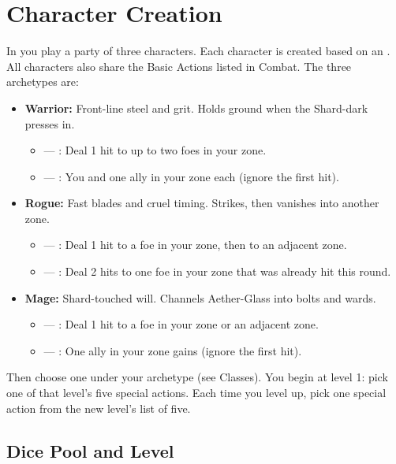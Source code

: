 \section{Character Creation}

In \game{} you play a party of three characters. Each character is created based on an .
All characters also share the Basic Actions listed in Combat. The three archetypes are:

\begin{itemize}
    \item \textbf{Warrior:} Front-line steel and grit. Holds ground when the Shard-dark presses in.
    \begin{itemize}
        \item {} --- \hard{} \hard{}: Deal 1 hit to up to two foes in your zone.
        \item {} --- \medium{} : You and one ally in your zone each  (ignore the first hit).
    \end{itemize}
    \item \textbf{Rogue:} Fast blades and cruel timing. Strikes, then vanishes into another zone.
    \begin{itemize}
        \item {} --- \medium{} : Deal 1 hit to a foe in your zone, then  to an adjacent zone.
        \item {} --- \hard{} \hard{}: Deal 2 hits to one foe in your zone that was already hit this round.
    \end{itemize}
    \item \textbf{Mage:} Shard-touched will. Channels Aether-Glass into bolts and wards.
    \begin{itemize}
        \item {} --- \medium{} : Deal 1 hit to a foe in your zone or an adjacent zone.
        \item {} --- \easy: One ally in your zone gains  (ignore the first hit).
    \end{itemize}
\end{itemize}

Then choose one  under your archetype (see Classes). You begin at level 1: pick one of that level's five special actions. Each time you level up, pick one special action from the new level's list of five.

\subsection{Dice Pool and Level}

